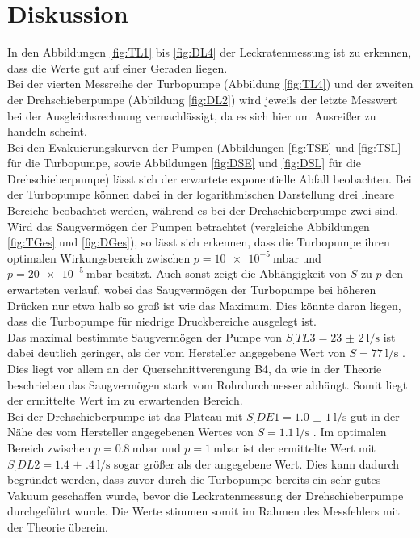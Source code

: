 
\section{Diskussion}
\label{sec:Diskussion}

In den Abbildungen \ref{fig:TL1} bis \ref{fig:DL4} der Leckratenmessung ist zu erkennen, dass die Werte gut auf einer Geraden liegen.\\
Bei der vierten Messreihe der Turbopumpe (Abbildung \ref{fig:TL4}) und der zweiten der Drehschieberpumpe (Abbildung \ref{fig:DL2}) wird jeweils der letzte Messwert bei der Ausgleichsrechnung vernachlässigt, da es sich hier um Ausreißer zu handeln scheint.\\
Bei den Evakuierungskurven der Pumpen (Abbildungen \ref{fig:TSE} und \ref{fig:TSL} für die Turbopumpe, sowie Abbildungen \ref{fig:DSE} und \ref{fig:DSL} für die Drehschieberpumpe) lässt sich der erwartete exponentielle Abfall beobachten. Bei der Turbopumpe können dabei in der logarithmischen Darstellung drei lineare Bereiche beobachtet werden, während es bei der Drehschieberpumpe zwei sind.\\
Wird das Saugvermögen der Pumpen betrachtet (vergleiche Abbildungen \ref{fig:TGes} und \ref{fig:DGes}), so lässt sich erkennen, dass die Turbopumpe ihren optimalen Wirkungsbereich zwischen $p=\SI{10e-5}{\milli\bar}$ und $p=\SI{20e-5}{\milli\bar}$ besitzt. Auch sonst zeigt die Abhängigkeit von $S$ zu $p$ den erwarteten verlauf, wobei das Saugvermögen der Turbopumpe bei höheren Drücken nur etwa halb so groß ist wie das Maximum. Dies könnte daran liegen, dass die Turbopumpe für niedrige Druckbereiche ausgelegt ist.\\
Das maximal bestimmte Saugvermögen der Pumpe von $S_.{TL3}=\SI{23(2)}{\litre\per\second}$ ist dabei deutlich geringer, als der vom Hersteller angegebene Wert von $S=\SI{77}{\litre\per\second}$ \cite{V70}. Dies liegt vor allem an der Querschnittverengung B4, da wie in der Theorie beschrieben das Saugvermögen stark vom Rohrdurchmesser abhängt. Somit liegt der ermittelte Wert im zu erwartenden Bereich.\\
Bei der Drehschieberpumpe ist das Plateau mit $S_.{DE1}=\SI{1,0(1)}{\litre\per\second}$ gut in der Nähe des vom Hersteller angegebenen Wertes von $S=\SI{1.1}{\litre\per\second}$ \cite{V70}.
Im optimalen Bereich zwischen $p=\SI{0.8}{\milli\bar}$ und $p=\SI{1}{\milli\bar}$ ist der ermittelte Wert mit $S_.{DL2}=\SI{1.4(4)}{\litre\per\second}$ sogar größer als der angegebene Wert. Dies kann dadurch begründet werden, dass zuvor durch die Turbopumpe bereits ein sehr gutes Vakuum geschaffen wurde, bevor die Leckratenmessung der Drehschieberpumpe durchgeführt wurde. Die Werte stimmen somit im Rahmen des Messfehlers mit der Theorie überein.   
